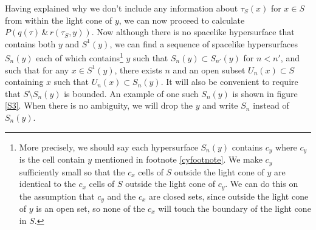 Having explained why we don't include any information about $\tau_S(x)$ for $x\in S$ from within the light cone of $y$, we can now proceed to calculate  $P(q(\tau) \, \&\,  r(\tau_S,y))$. Now although there is no spacelike hypersurface that contains both $y$ and $S^1(y)$, we can find a sequence of spacelike hypersurfaces $S_n(y)$ each of which contains\footnote{More precisely, we should say each hypersurface $S_n(y)$ contains $c_y$ where $c_y$ is the cell contain $y$ mentioned in footnote \ref{cyfootnote}. We make $c_y$ sufficiently small so that the $c_x$ cells of $S$ outside the light cone of $y$ are identical to the $c_x$ cells of $S$ outside the light cone of $c_y$. We can do this on the assumption that $c_y$ and the $c_x$ are closed sets, since outside the light cone of $y$ is an open set, so none of the $c_x$ will touch the boundary of the light cone in $S$. } $y$ such that\label{siydef} $S_n(y)\subset S_{n'}(y)$ for $n<n'$, and such that for any $x\in S^1(y)$, there exists $n$ and an open subset $U_n(x)\subset S$ containing $x$ such that $U_n(x)\subset S_n(y)$. It will also be convenient to require that $S\setminus S_n(y)$ is bounded. An example of one such $S_n(y)$ is shown in figure \ref{S3}. When there is no ambiguity, we will drop the $y$ and write $S_n$ instead of $S_n(y)$. 
